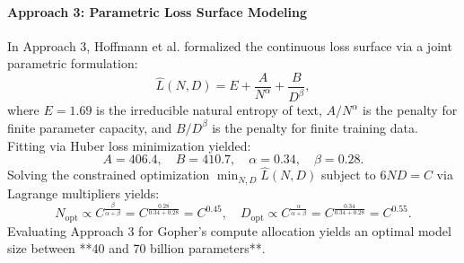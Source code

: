 \documentclass[../../main.tex]{subfiles}
\begin{document}
\paragraph{Approach 3: Parametric Loss Surface Modeling}
In Approach 3, Hoffmann et al. formalized the continuous loss surface via a joint parametric formulation:
\begin{equation}
\hat{L}(N, D) = E + \frac{A}{N^\alpha} + \frac{B}{D^\beta},
\label{eq:parametric_loss_surface}
\end{equation}
where $E = 1.69$ is the irreducible natural entropy of text, $A / N^\alpha$ is the penalty for finite parameter capacity, and $B / D^\beta$ is the penalty for finite training data. Fitting via Huber loss minimization yielded:
\begin{equation}
A = 406.4, \quad B = 410.7, \quad \alpha = 0.34, \quad \beta = 0.28.
\label{eq:chinchilla_fitted_params}
\end{equation}
Solving the constrained optimization $\min_{N, D} \hat{L}(N, D)$ subject to $6ND = C$ via Lagrange multipliers yields:
\begin{equation}
N_{\text{opt}} \propto C^{\frac{\beta}{\alpha + \beta}} = C^{\frac{0.28}{0.34+0.28}} = C^{0.45}, \quad D_{\text{opt}} \propto C^{\frac{\alpha}{\alpha + \beta}} = C^{\frac{0.34}{0.34+0.28}} = C^{0.55}.
\label{eq:chinchilla_approach3_exponents}
\end{equation}
Evaluating Approach 3 for Gopher's compute allocation yields an optimal model size between **40 and 70 billion parameters**.
\end{document}
